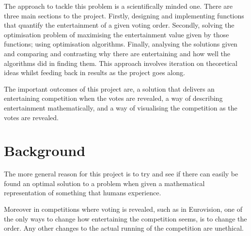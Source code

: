 \documentclass[12pt]{report}
\begin{document}
The approach to tackle this problem is a scientifically minded one. There are three main sections to the project. Firstly, designing and implementing functions that quantify the entertainment of a given voting order. Secondly, solving the optimisation problem of maximising the entertainment value given by those functions; using optimisation algorithms. Finally, analysing the solutions given and comparing and contrasting why there are entertaining and how well the algorithms did in finding them. This approach involves iteration on theoretical ideas whilst feeding back in results as the project goes along.

The important outcomes of this project are, a solution that delivers an entertaining competition when the votes are revealed, a way of describing entertainment mathematically, and a way of visualising the competition as the votes are revealed.

\section{Background}\label{Background}
The more general reason for this project is to try and see if there can easily be found an optimal solution to a problem when given a mathematical representation of something that humans experience. 

Moreover in competitions where voting is revealed, such as in Eurovision, one of the only ways to change how entertaining the competition seems, is to change the order. Any other changes to the actual running of the competition are unethical.
\end{document}
